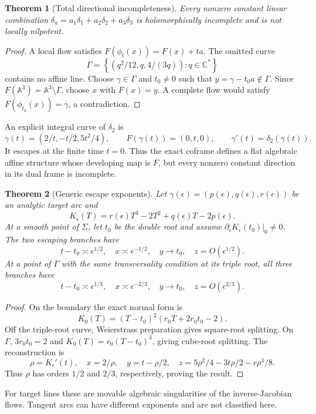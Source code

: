 \documentclass[11pt]{article}
\newtheorem{theorem}{Theorem}[section]
\theoremstyle{remark}
\newcommand{\A}{\mathbb A}
\newcommand{\C}{\mathbb C}
\begin{document}
\begin{theorem}[Total directional incompleteness]
Every nonzero constant linear combination
$\delta_a=a_1\delta_1+a_2\delta_2+a_3\delta_3$ is holomorphically incomplete
and is not locally nilpotent.
\end{theorem}
\begin{proof}
A local flow satisfies $F(\phi_t(x))=F(x)+ta$. The omitted curve
\[
\Gamma=\left\{\left(q^2/12,q,4/(3q)\right):q\in\C^*\right\}
\]
contains no affine line. Choose $\gamma\in\Gamma$ and $t_0\ne0$ such that
$y=\gamma-t_0a\notin\Gamma$. Since $F(\A^3)=\A^3\setminus\Gamma$, choose
$x$ with $F(x)=y$. A complete flow would satisfy
$F(\phi_{t_0}(x))=\gamma$, a contradiction.
\end{proof}

An explicit integral curve of $\delta_2$ is
\[
\gamma(t)=\left(2/t,-t/2,5t^2/4\right),\qquad
F(\gamma(t))=(0,t,0),\qquad \gamma'(t)=\delta_2(\gamma(t)).
\]
It escapes at the finite time $t=0$. Thus the exact coframe defines a flat
algebraic affine structure whose developing map is $F$, but every nonzero
constant direction in its dual frame is incomplete.

\begin{theorem}[Generic escape exponents]
Let $\gamma(\epsilon)=(p(\epsilon),q(\epsilon),r(\epsilon))$ be an analytic
target arc and
\[
K_\epsilon(T)=r(\epsilon)T^3-2T^2+q(\epsilon)T-2p(\epsilon).
\]
At a smooth point of $\Sigma$, let $t_0$ be the double root and assume
$\partial_\epsilon K_\epsilon(t_0)|_0\ne0$. The two escaping branches have
\[
t-t_0\asymp\epsilon^{1/2},\quad x\asymp\epsilon^{-1/2},
\quad y\to t_0,\quad z=O(\epsilon^{1/2}).
\]
At a point of $\Gamma$ with the same transversality condition at its triple
root, all three branches have
\[
t-t_0\asymp\epsilon^{1/3},\quad x\asymp\epsilon^{-2/3},
\quad y\to t_0,\quad z=O(\epsilon^{2/3}).
\]
\end{theorem}
\begin{proof}
On the boundary the exact normal form is
\[
K_0(T)=(T-t_0)^2(r_0T+2r_0t_0-2).
\]
Off the triple-root curve, Weierstrass preparation gives square-root
splitting. On $\Gamma$, $3r_0t_0=2$ and
$K_0(T)=r_0(T-t_0)^3$, giving cube-root splitting. The reconstruction is
\[
\rho=K_\epsilon'(t),\quad x=2/\rho,\quad y=t-\rho/2,
\quad z=5\rho^2/4-3t\rho/2-r\rho^3/8.
\]
Thus $\rho$ has orders $1/2$ and $2/3$, respectively, proving the result.
\end{proof}

For target lines these are movable algebraic singularities of the
inverse-Jacobian flows. Tangent arcs can have different exponents and are not
classified here.
\end{document}
